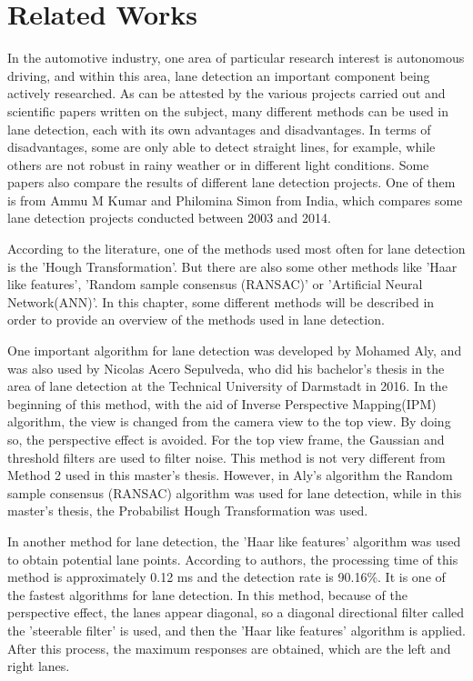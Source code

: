 %
\chapter{Related Works}\label{cha:Related Works}

In the automotive industry, one area of particular research interest is autonomous driving, and within this area, lane detection an important component being actively researched. As can be attested by the various projects carried out and scientific papers written on the subject, many different methods can be used in lane detection, each with its own advantages and disadvantages. In terms of disadvantages, some are only able to detect straight lines, for example, while others are not robust in rainy weather or in different light conditions. Some papers also compare the results of different lane detection projects. One of them is from Ammu M Kumar and Philomina Simon from India, which compares some lane detection projects conducted between 2003 and 2014.\cite{Review_of_Lane_Detection}
 
According to the literature, one of the methods used most often for lane detection is the 'Hough Transformation'. But there are also some other methods like 'Haar like features', 'Random sample consensus (RANSAC)' or 'Artificial Neural Network(ANN)'. In this chapter, some different methods will be described in order to provide an overview of the methods used in lane detection.

One important algorithm for lane detection was developed by Mohamed Aly, and was also used by Nicolas Acero Sepulveda, who did his bachelor's thesis in the area of lane detection at the Technical University of Darmstadt in 2016.\cite{Bachelorthesis_Nicolas} In the beginning of this method, with the aid of Inverse Perspective Mapping(IPM) algorithm, the view is changed from the camera view to the top view. By doing so, the perspective effect is avoided. For the top view frame, the Gaussian and threshold filters are used to filter noise. This method is not very different from Method 2 used in this master's thesis. However, in Aly's algorithm the Random sample consensus (RANSAC) algorithm was used for lane detection, while in this master's thesis, the Probabilist Hough Transformation was used.

In another method\cite{An_Efficient_Lane_Detection} for lane detection, the 'Haar like features' algorithm was used to obtain potential lane points. According to authors, the processing time of this method is approximately 0.12 ms and the detection rate is 90.16\%. It is one of the fastest algorithms for lane detection. In this method, because of the perspective effect, the lanes appear diagonal, so a diagonal directional filter called the 'steerable filter' is used, and then the 'Haar like features' algorithm is applied. After this process, the maximum responses are obtained, which are the left and right lanes.

